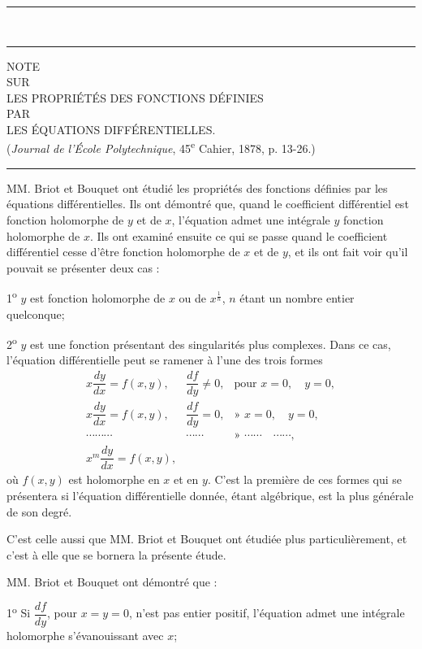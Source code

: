 \documentclass[11pt]{article}
\newcommand{\ornament}{\begin{center}\rule{2.5em}{0.4pt}\,\raisebox{0.1ex}{\tiny$\bullet\bullet\bullet$}\,\rule{2.5em}{0.4pt}\end{center}}
\newcommand{\shortline}{\begin{center}\rule{3.5em}{0.4pt}\end{center}}
\begin{document}
\ornament
\clearpage

\begin{center}
{\Large NOTE}\\[0.8em]
{\small SUR}\\[0.8em]
{\LARGE LES PROPRIÉTÉS DES FONCTIONS DÉFINIES}\\[0.8em]
{\small PAR}\\[0.8em]
{\Large LES ÉQUATIONS DIFFÉRENTIELLES.}\\[1.2em]
{\small (\emph{Journal de l’École Polytechnique}, 45\textsuperscript{e} Cahier, 1878, p. 13-26.)}
\end{center}
\shortline

MM. Briot et Bouquet ont étudié les propriétés des fonctions définies par les équations différentielles. Ils ont démontré que, quand le coefficient différentiel est fonction holomorphe de $y$ et de $x$, l’équation admet une intégrale $y$ fonction holomorphe de $x$. Ils ont examiné ensuite ce qui se passe quand le coefficient différentiel cesse d’être fonction holomorphe de $x$ et de $y$, et ils ont fait voir qu’il pouvait se présenter deux cas :

1\textsuperscript{o} $y$ est fonction holomorphe de $x$ ou de $x^{\frac1n}$, $n$ étant un nombre entier quelconque;

2\textsuperscript{o} $y$ est une fonction présentant des singularités plus complexes. Dans ce cas, l’équation différentielle peut se ramener à l’une des trois formes
\[
\begin{array}{lll}
x\dfrac{dy}{dx}=f(x,y), & \dfrac{df}{dy}\ne0, & \text{pour } x=0,\quad y=0,\\[0.7em]
x\dfrac{dy}{dx}=f(x,y), & \dfrac{df}{dy}=0, & \text{» } x=0,\quad y=0,\\[0.4em]
\cdots\cdots\cdots & \cdots\cdots & \text{» } \cdots\cdots\quad \cdots\cdots,\\[0.7em]
x^m\dfrac{dy}{dx}=f(x,y), & &
\end{array}
\]
où $f(x,y)$ est holomorphe en $x$ et en $y$. C’est la première de ces formes qui se présentera si l’équation différentielle donnée, étant algébrique, est la plus générale de son degré.

C’est celle aussi que MM. Briot et Bouquet ont étudiée plus particulièrement, et c’est à elle que se bornera la présente étude.

MM. Briot et Bouquet ont démontré que :

1\textsuperscript{o} Si $\dfrac{df}{dy}$, pour $x=y=0$, n’est pas entier positif, l’équation admet une intégrale holomorphe s’évanouissant avec $x$;
\end{document}

